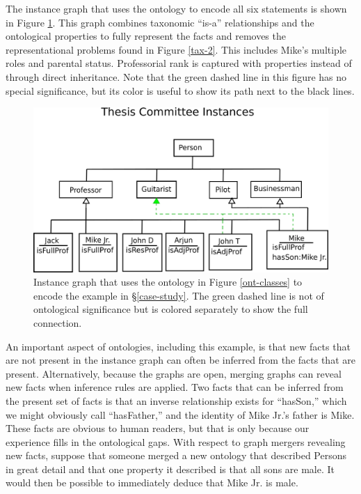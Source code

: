 The instance graph that uses the ontology to encode all six statements is shown
in Figure \ref{ont-instances}. This graph combines taxonomic ``is-a''
relationships and the ontological properties to fully represent the facts
and removes the representational problems found in Figure \ref{tax-2}. This
includes Mike's multiple roles and parental status. Professorial rank is
captured with properties instead of through direct inheritance. Note that the
green dashed line in this figure has no special significance, but its color is useful
to show its path next to the black lines.

\begin{figure}[htbp]
\centering
\includegraphics[width=\textwidth]{figures/tc-ont-instances.png}
\caption{Instance graph that uses the ontology in Figure \ref{ont-classes}
to encode the example in \S \ref{case-study}. The green dashed line is not of
ontological significance but is colored separately to show the full connection.}
\label{ont-instances}
\end{figure}

An important aspect of ontologies, including this example, is that new facts
that are not present in the instance graph can often be inferred from the facts that
are present. Alternatively, because the graphs are open, merging graphs can
reveal new facts when inference rules are applied. Two facts that can be
inferred from the present set of facts is that an inverse relationship exists
for ``hasSon,'' which we might obviously call ``hasFather,'' and the identity of
Mike Jr.'s father is Mike. These facts are obvious to human readers, but that is
only because our experience fills in the ontological gaps. With respect to graph
mergers revealing new facts, suppose that someone merged a new ontology that
described Persons in great detail and that one property it described is that
all sons are male. It would then be possible to immediately deduce that Mike Jr.
is male.

